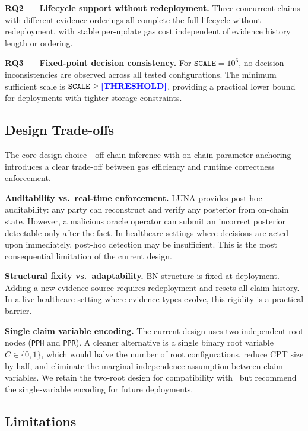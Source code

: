 \documentclass[journal]{IEEEtran}
\newcommand{\placeholder}[1]{\textcolor{blue}{\textbf{[#1]}}}
\begin{document}
\textbf{RQ2 --- Lifecycle support without
redeployment.}
Three concurrent claims with different evidence
orderings all complete the full lifecycle without
redeployment, with stable per-update gas cost
independent of evidence history length or ordering.

\textbf{RQ3 --- Fixed-point decision consistency.}
For $\texttt{SCALE}=10^6$, no decision
inconsistencies are observed across all tested
configurations. The minimum sufficient scale is
$\texttt{SCALE}\geq\placeholder{THRESHOLD}$,
providing a practical lower bound for deployments
with tighter storage constraints.

\subsection{Design Trade-offs}

The core design choice---off-chain inference with
on-chain parameter anchoring---introduces a clear
trade-off between gas efficiency and runtime
correctness enforcement.

\textbf{Auditability vs.\ real-time enforcement.}
LUNA provides post-hoc auditability: any party can
reconstruct and verify any posterior from on-chain
state. However, a malicious oracle operator can
submit an incorrect posterior detectable only after
the fact. In healthcare settings where decisions are
acted upon immediately, post-hoc detection may be
insufficient. This is the most consequential
limitation of the current design.

\textbf{Structural fixity vs.\ adaptability.}
BN structure is fixed at deployment. Adding a new
evidence source requires redeployment and resets all
claim history. In a live healthcare setting where
evidence types evolve, this rigidity is a practical
barrier.

\textbf{Single claim variable encoding.}
The current design uses two independent root nodes
(\texttt{PPH} and \texttt{PPR}). A cleaner
alternative is a single binary root variable
$C\in\{0,1\}$, which would halve the number of root
configurations, reduce CPT size by half, and
eliminate the marginal independence assumption between
claim variables. We retain the two-root design for
compatibility with~\cite{bn-oracle} but recommend the
single-variable encoding for future deployments.

\subsection{Limitations}
\label{sec:limitations}
\end{document}
